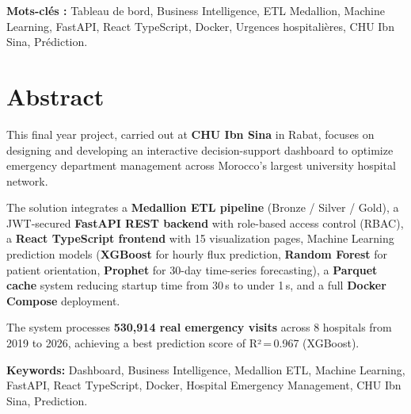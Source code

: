 \documentclass[12pt,a4paper]{report}
\begin{document}
	\textbf{Mots-clés :} Tableau de bord, Business Intelligence, ETL Medallion, Machine Learning,
	FastAPI, React TypeScript, Docker, Urgences hospitalières, CHU Ibn Sina, Prédiction.
	
	\chapter*{Abstract}
	
	This final year project, carried out at \textbf{CHU Ibn Sina} in Rabat, focuses on designing
	and developing an interactive decision-support dashboard to optimize emergency department
	management across Morocco's largest university hospital network.
	
	The solution integrates a \textbf{Medallion ETL pipeline} (Bronze / Silver / Gold), a
	JWT-secured \textbf{FastAPI REST backend} with role-based access control (RBAC), a
	\textbf{React TypeScript frontend} with 15 visualization pages, Machine Learning prediction
	models (\textbf{XGBoost} for hourly flux prediction, \textbf{Random Forest} for patient
	orientation, \textbf{Prophet} for 30-day time-series forecasting), a \textbf{Parquet cache}
	system reducing startup time from 30\,s to under 1\,s, and a full \textbf{Docker Compose}
	deployment.
	
	The system processes \textbf{530,914 real emergency visits} across 8 hospitals from 2019
	to 2026, achieving a best prediction score of R²\,=\,0.967 (XGBoost).
	
	\textbf{Keywords:} Dashboard, Business Intelligence, Medallion ETL, Machine Learning,
	FastAPI, React TypeScript, Docker, Hospital Emergency Management, CHU Ibn Sina, Prediction.
	\newpage
	\clearpage
	\renewcommand{\contentsname}{Table des matières}
	\tableofcontents
	
	\newpage
	\listoffigures
	\newpage
	\listoftables
	
\end{document}
